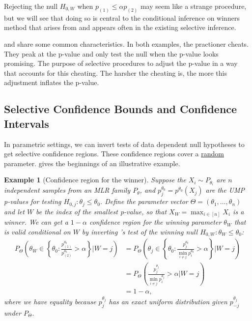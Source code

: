 \documentclass{article}
\newtheorem{example}{Example}
\begin{document}
Rejecting the null $H_{0, W}$ when $p_{(1)} \leq \alpha p_{(2)}$ may seem like a strange procedure, but we will see that doing so is central to the conditional inference on winners method that arises from \cite{Fithian2017} and appears often in the existing selective inference. 

 and  share some common characteristics. In both examples, the practioner cheats. They peak at the p-value and only test the null when the p-value looks promising. The purpose of selective  procedures to adjust the p-value in a way that accounts for this cheating. The harsher the cheating is, the more this adjustment inflates the p-value. 

\subsection{Selective Confidence Bounds and Confidence Intervals}

In parametric settings, we can  invert tests of data dependent null hypotheses to get selective confidence regions. These confidence regions cover a \underline{random} parameter.  gives the beginnings of an illustrative example. 

\begin{example}[Confidence region for the winner] 
    \label{exm:confidence_region}
    Suppose the $X_i \sim P_{\theta_i}$ are $n$ independent samples from an MLR family $P_{\theta}$, and $p^{\theta_0}_j =  p^{\theta_0}(X_j)$ are the UMP p-values for testing $H_{0, j} : \theta_j \leq \theta_0$. Define the parameter vector $\Theta = (\theta_1, \dots, \theta_n)$ and let $W$ be the index of the smallest p-value, so that $X_W = \max_{i \in [n]} X_i$ is a winner. We can get a $1-\alpha$ confidence region for the winning parameter $\theta_W$ that is valid conditional on $W$ by inverting 's test of the winning null $H_{0, W} : \theta_W \leq \theta_0$:
    \begin{align*}
        \label{eq:winner_cr}
        P_{\Theta}\left( \theta_W \in \left\{ \theta_0 : \frac{p^{\theta_0}_{(1)}}{p^{\theta_0}_{(2)}} > \alpha \right\} | W=j \right) &= P_{\Theta}\left( \theta_j \in \left\{ \theta_0 : \frac{p^{\theta_0}_{j}}{ \min_{i \neq j} p^{\theta_0}_i} > \alpha \right\} | W=j \right)\\
                                     &= P_{\Theta}\left(  \frac{p^{\theta_j}_{j}}{ \min_{i \neq j} p^{\theta_j}_i} > \alpha  | W=j \right)\\
                                    &= 1-\alpha,
    \end{align*} 
    where we have equality because $p^{\theta_j}_j$ has an exact uniform distribution given $p^{\theta_j}_{-j}$ under $P_{\Theta}$. 
\end{example}
\end{document}
